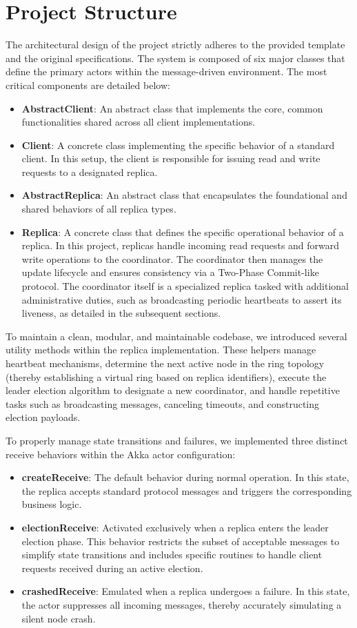\section{Project Structure}
The architectural design of the project strictly adheres to the provided template and the original specifications. The system is composed of six major classes that define the primary actors within the message-driven environment. 
The most critical components are detailed below:
\begin{itemize}
    \item \textbf{AbstractClient}: An abstract class that implements the core, common functionalities shared across all client implementations.
    \item \textbf{Client}: A concrete class implementing the specific behavior of a standard client. In this setup, the client is responsible for issuing read and write requests to a designated replica.
    \item \textbf{AbstractReplica}: An abstract class that encapsulates the foundational and shared behaviors of all replica types.
    \item \textbf{Replica}: A concrete class that defines the specific operational behavior of a replica. In this project, replicas handle incoming read requests and forward write operations to the coordinator. The coordinator then manages the update lifecycle and ensures consistency via a Two-Phase Commit-like protocol. The coordinator itself is a specialized replica tasked with additional administrative duties, such as broadcasting periodic heartbeats to assert its liveness, as detailed in the subsequent sections.
\end{itemize}

To maintain a clean, modular, and maintainable codebase, we introduced several utility methods within the replica implementation. These helpers manage heartbeat mechanisms, determine the next active node in the ring topology (thereby establishing a virtual ring based on replica identifiers), execute the leader election algorithm to designate a new coordinator, and handle repetitive tasks such as broadcasting messages, canceling timeouts, and constructing election payloads.

To properly manage state transitions and failures, we implemented three distinct receive behaviors within the Akka actor configuration:
\begin{itemize}
    \item \textbf{createReceive}: The default behavior during normal operation. In this state, the replica accepts standard protocol messages and triggers the corresponding business logic.
    \item \textbf{electionReceive}: Activated exclusively when a replica enters the leader election phase. This behavior restricts the subset of acceptable messages to simplify state transitions and includes specific routines to handle client requests received during an active election.
    \item \textbf{crashedReceive}: Emulated when a replica undergoes a failure. In this state, the actor suppresses all incoming messages, thereby accurately simulating a silent node crash.
\end{itemize}